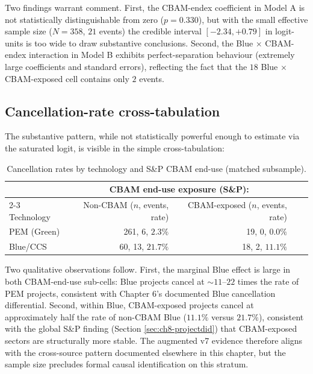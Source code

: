 \documentclass[11pt,a4paper]{article}
\begin{document}
Two findings warrant comment. First, the CBAM-endex coefficient in Model A is not statistically distinguishable from zero ($p = 0.330$), but with the small effective sample size ($N=358$, $21$ events) the credible interval $[-2.34, +0.79]$ in logit-units is too wide to draw substantive conclusions. Second, the Blue $\times$ CBAM-endex interaction in Model B exhibits perfect-separation behaviour (extremely large coefficients and standard errors), reflecting the fact that the $18$ Blue $\times$ CBAM-exposed cell contains only $2$ events.

\subsection{Cancellation-rate cross-tabulation}

The substantive pattern, while not statistically powerful enough to estimate via the saturated logit, is visible in the simple cross-tabulation:

\begin{table}[ht]
\centering
\caption{Cancellation rates by technology and S\&P CBAM end-use (matched subsample).}
\label{tab:app-augmented-crosstab}
\begin{tabular}{lrrrr}
\toprule
& \multicolumn{2}{c}{CBAM end-use exposure (S\&P):} \\
\cmidrule(lr){2-3}
Technology & Non-CBAM ($n$, events, rate) & CBAM-exposed ($n$, events, rate) \\
\midrule
PEM (Green) & 261, 6, $2.3\%$ & 19, 0, $0.0\%$ \\
Blue/CCS    & 60, 13, $21.7\%$ & 18, 2, $11.1\%$ \\
\bottomrule
\end{tabular}
\end{table}

Two qualitative observations follow. First, the marginal Blue effect is large in both CBAM-end-use sub-cells: Blue projects cancel at $\sim 11$--$22$ times the rate of PEM projects, consistent with Chapter 6's documented Blue cancellation differential. Second, within Blue, CBAM-exposed projects cancel at approximately half the rate of non-CBAM Blue ($11.1\%$ versus $21.7\%$), consistent with the global S\&P finding (Section \ref{sec:ch8-projectdid}) that CBAM-exposed sectors are structurally more stable. The augmented v7 evidence therefore aligns with the cross-source pattern documented elsewhere in this chapter, but the sample size precludes formal causal identification on this stratum.
\end{document}
